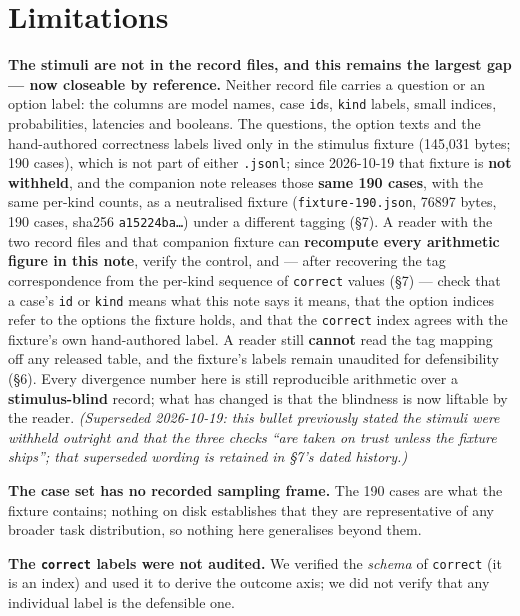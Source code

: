 \documentclass[11pt,a4paper]{article}
\begin{document}
\section{Limitations}

\textbf{The stimuli are not in the record files, and this remains the largest gap --- now closeable by reference.} Neither record file carries a question or an option label: the columns are model names, case \texttt{id}s, \texttt{kind} labels, small indices, probabilities, latencies and booleans. The questions, the option texts and the hand-authored correctness labels lived only in the stimulus fixture (145,031 bytes; 190 cases), which is not part of either \texttt{.jsonl}; since 2026-10-19 that fixture is \textbf{not withheld}, and the companion note releases those \textbf{same 190 cases}, with the same per-kind counts, as a neutralised fixture (\texttt{fixture-190.json}, 76897 bytes, 190 cases, sha256 \texttt{a15224ba\ldots{}}) under a different tagging (\S7). A reader with the two record files and that companion fixture can \textbf{recompute every arithmetic figure in this note}, verify the control, and --- after recovering the tag correspondence from the per-kind sequence of \texttt{correct} values (\S7) --- check that a case's \texttt{id} or \texttt{kind} means what this note says it means, that the option indices refer to the options the fixture holds, and that the \texttt{correct} index agrees with the fixture's own hand-authored label. A reader still \textbf{cannot} read the tag mapping off any released table, and the fixture's labels remain unaudited for defensibility (\S6). Every divergence number here is still reproducible arithmetic over a \textbf{stimulus-blind} record; what has changed is that the blindness is now liftable by the reader. \emph{(Superseded 2026-10-19: this bullet previously stated the stimuli were withheld outright and that the three checks ``are taken on trust unless the fixture ships''; that superseded wording is retained in \S7's dated history.)}

\textbf{The case set has no recorded sampling frame.} The 190 cases are what the fixture contains; nothing on disk establishes that they are representative of any broader task distribution, so nothing here generalises beyond them.

\textbf{The \texttt{correct} labels were not audited.} We verified the \emph{schema} of \texttt{correct} (it is an index) and used it to derive the outcome axis; we did not verify that any individual label is the defensible one.
\end{document}
